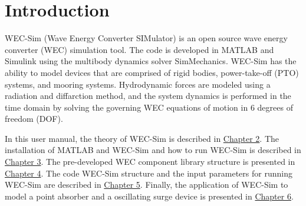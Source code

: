 \chapter{Introduction}
WEC-Sim (Wave Energy Converter SIMulator) is an open source wave energy converter (WEC) simulation tool. The code is developed in MATLAB and Simulink using the multibody dynamics solver SimMechanics. WEC-Sim has the ability to model devices that are comprised of rigid bodies, power-take-off (PTO) systems, and mooring systems. Hydrodynamic forces are modeled using a radiation and diffarction method, and the system dynamics is performed in the time domain by solving the governing WEC equations of motion in 6 degrees of freedom (DOF).

In this user manual, the theory of WEC-Sim is described in \hyperlink{chapter.2}{Chapter 2}. The installation of MATLAB and WEC-Sim and how to run WEC-Sim is described in \hyperlink{chapter.3}{Chapter 3}. The pre-developed WEC component library structure is presented in \hyperlink{chapter.4}{Chapter 4}. The code WEC-Sim structure and the input parameters for running WEC-Sim are described in \hyperlink{chapter.5}{Chapter 5}. Finally, the application of WEC-Sim to model a point absorber and a oscillating surge device is presented in \hyperlink{chapter.6}{Chapter 6}.
